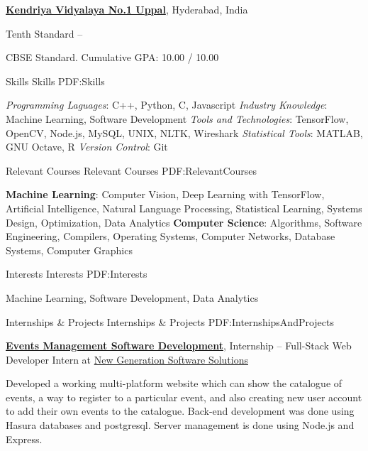\documentclass[letterpaper,MMMyyyy,nonstopmode]{simpleresumecv}
\begin{document}
\begin{Body}
\BigGap
\Entry
\href{https://www.kv1uppal.edu.in/}
{\textbf{Kendriya Vidyalaya No.1 Uppal}},
Hyderabad, India

\Gap
\BulletItem
Tenth Standard
\hfill
{} --
\begin{Detail}
\SubBulletItem
CBSE Standard.
\SubBulletItem
Cumulative GPA: 10.00 / 10.00
\end{Detail}



\Section
{Skills}
{Skills}
{PDF:Skills}

\Entry
\BulletItem
\textit{Programming Laguages}: C++, Python, C, Javascript
\BulletItem
\textit{Industry Knowledge}: Machine Learning, Software Development
\BulletItem
\textit{Tools and Technologies}: TensorFlow, OpenCV, Node.js, MySQL, UNIX, NLTK, Wireshark
\BulletItem
\textit{Statistical Tools}: MATLAB, GNU Octave, R
\BulletItem
\textit{Version Control}: Git


\Section
{Relevant Courses}
{Relevant Courses}
{PDF:RelevantCourses}

\Entry
\textbf{Machine Learning}: Computer Vision, Deep Learning with TensorFlow, Artificial Intelligence, Natural Language Processing, Statistical Learning, Systems Design, Optimization, Data Analytics
\Gap
\textbf{Computer Science}: Algorithms, Software Engineering, Compilers, Operating Systems, Computer Networks, Database Systems, Computer Graphics


\Section
{Interests}
{Interests}
{PDF:Interests}

\Entry
Machine Learning, Software Development, Data Analytics





\Section
{Internships \newline
\& Projects}
{Internships \& Projects}
{PDF:InternshipsAndProjects}

\Entry
\href{http://}
{\textbf{Events Management Software Development}},
Internship
\hfill
{} --
\Gap
\BulletItem
Full-Stack Web Developer Intern at
\href{http://}
{New Generation Software Solutions}
\begin{Detail}
\SubBulletItem
Developed a working multi-platform website which can show the catalogue of events, a way to register to a particular event, and also creating new user account to add their own events to the catalogue.
\SubBulletItem
Back-end development was done using Hasura databases and postgresql. Server management is done using Node.js and Express.
\end{Detail}


\end{Body}
\end{document}

